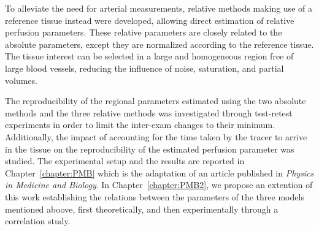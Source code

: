 To alleviate the need for arterial measurements, relative methods making use of a reference tissue instead were developed, allowing direct estimation of relative perfusion parameters.
These relative parameters are closely related to the absolute parameters, except they are normalized according to the reference tissue.
The tissue interest can be selected in a large and homogeneous region free of large blood vessels, reducing the influence of noise, saturation, and partial volumes.

The reproducibility of the regional parameters estimated using the two absolute methods and the three relative methods was investigated through test-retest experiments in order to limit the inter-exam changes to their minimum.
Additionally, the impact of accounting for the time taken by the tracer to arrive in the tissue on the reproducibility of the estimated perfusion parameter was studied. 
The experimental setup and the results are reported in Chapter~\ref{chapter:PMB} which is the adaptation of an article published in {\em Physics in Medicine and Biology}.
In Chapter~\ref{chapter:PMB2}, we propose an extention of this work establishing the relations between the parameters of the three models mentioned aboove, first theoretically, and then experimentally through a correlation study.